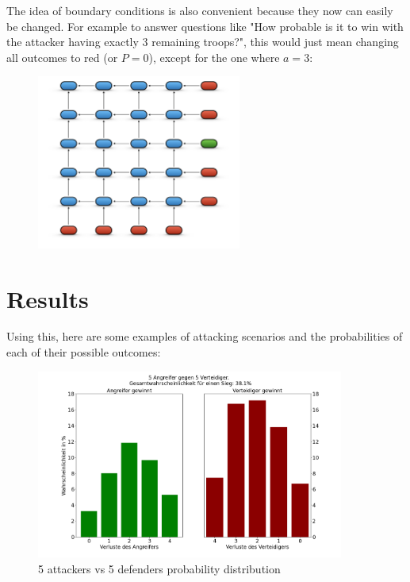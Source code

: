 \documentclass[11pt,a4paper]{article}
\begin{document}
The idea of boundary conditions is also convenient because they now can easily be changed. For example to answer questions like "How probable is it to win with the attacker having exactly 3 remaining troops?", this would just mean changing all outcomes to red (or $P=0$), except for the one where $a=3$:

\begin{figure}[H]
\centering
\includegraphics[width=0.6\textwidth]{../images/Boundary Conditions.png}
\end{figure}

\section{Results}
Using this, here are some examples of attacking scenarios and the probabilities of each of their possible outcomes:

\begin{figure}[H]
\centering
\includegraphics[width=0.9\textwidth]{../images/Risk5v5.png}
\caption{5 attackers vs 5 defenders probability distribution}
\end{figure}
\end{document}
